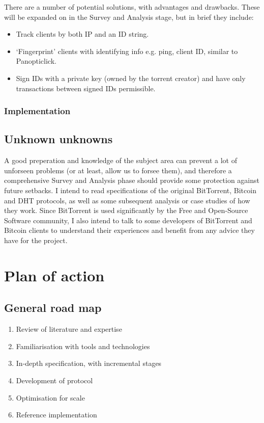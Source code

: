 \documentclass{article}
\begin{document}
There are a number of potential solutions, with advantages and drawbacks.  These will be expanded on in the Survey and Analysis stage, but in brief they include:
\begin{itemize}
\item Track clients by both IP and an ID string.
\item `Fingerprint' clients with identifying info e.g. ping, client ID, similar to Panopticlick.
\item Sign IDs with a private key (owned by the torrent creator) and have only transactions between signed IDs permissible.
\end{itemize}

\subsubsection{Implementation}

\subsection{Unknown unknowns}
A good preperation and knowledge of the subject area can prevent a lot of unforseen problems (or at least, allow us to forsee them), and therefore a comprehensive Survey and Analysis phase should provide some protection against future setbacks.  I intend to read specifications of the original BitTorrent, Bitcoin and DHT protocols, as well as some subsequent analysis or case studies of how they work.  Since BitTorrent is used significantly by the Free and Open-Source Software community, I also intend to talk to some developers of BitTorrent and Bitcoin clients to understand their experiences and benefit from any advice they have for the project.

\section{Plan of action}
\subsection{General road map}
\begin{enumerate}
\item Review of literature and expertise
\item Familiarisation with tools and technologies
\item In-depth specification, with incremental stages
\item Development of protocol
\item Optimisation for scale
\item Reference implementation
\end{enumerate}
\end{document}
